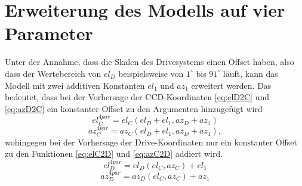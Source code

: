 \section{Erweiterung des Modells auf vier Parameter}
\label{se:4par}
Unter der Annahme, dass die Skalen des Drivesystems einen Offset haben, also dass der Wertebereich von $el_D$ beispielsweise von $1^{\circ}$ bis $91^{\circ}$ läuft, kann das Modell mit zwei additiven Konstanten $el_1$ und $az_1$ erweitert werden. Das bedeutet, dass bei der Vorhersage der CCD-Koordinaten \ref{eq:elD2C} und \ref{eq:azD2C} ein konstanter Offset zu den Argumenten hinzugefügt wird
\begin{equation}
el_C^{4par}=el_C(el_D+el_1,az_D+az_1)
\label{eq:elD2C4}
\end{equation}
\begin{equation}
az_C^{4par}=az_C(el_D+el_1,az_D+az_1),
\label{eq:azD2C4}
\end{equation}
wohingegen bei der Vorhersage der Drive-Koordinaten nur ein konstanter Offset zu den Funktionen \ref{eq:elC2D} und \ref{eq:azC2D} addiert wird.
\begin{equation}
el_D^{4par}=el_D(el_C,az_C)+el_1
\label{eq:elC2D4}
\end{equation}
\begin{equation}
az_D^{4par}=az_D(el_C,az_C)+az_1
\label{eq:azC2D4}
\end{equation}
